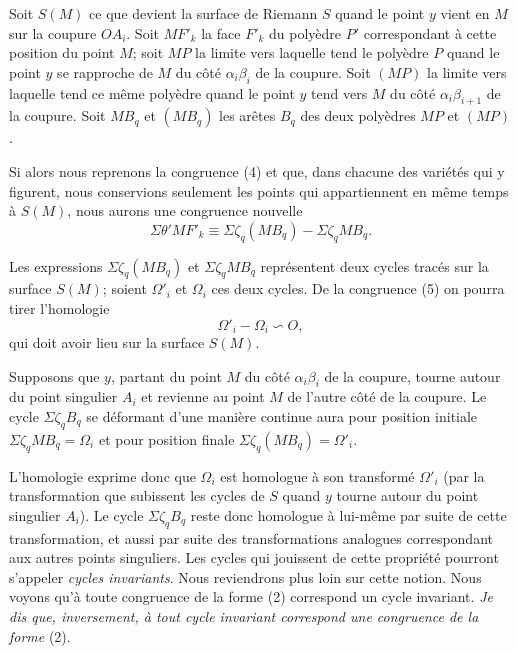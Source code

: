 \documentclass{article}
\begin{document}
Soit $S(M)$ ce que devient la surface de Riemann $S$ quand le point $y$ vient en $M$ sur la coupure $OA_{i}$. Soit $MF'_{k}$ la face $F'_{k}$ du polyèdre $P'$ correspondant à cette position du point $M$; soit $MP$ la limite vers laquelle tend le polyèdre $P$ quand le point $y$ se rapproche de $M$ du côté $\alpha_{i}\beta_{i}$ de la coupure. Soit $(MP)$ la limite vers laquelle tend ce même polyèdre quand le point $y$ tend vers $M$ du côté $\alpha_{i}\beta_{i+1}$ de la coupure. Soit $MB_{q}$ et $(MB_{q})$ les arêtes $B_{q}$ des deux polyèdres $MP$ et $(MP)$.

Si alors nous reprenons la congruence (4) et que, dans chacune des variétés qui y figurent, nous conservions seulement les points qui appartiennent en même temps à $S(M)$, nous aurons une congruence nouvelle
\[ \Sigma \theta' MF'_{k} \equiv \Sigma \zeta_{q} (MB_{q}) - \Sigma \zeta_{q} MB_{q}. \tag{5} \]

Les expressions $\Sigma \zeta_{q} (MB_{q})$ et $\Sigma \zeta_{q} MB_{q}$ représentent deux cycles tracés sur la surface $S(M)$; soient $\Omega'_{i}$ et $\Omega_{i}$ ces deux cycles. De la congruence (5) on pourra tirer l'homologie
\[ \Omega'_{i} - \Omega_{i} \backsim O, \tag{6} \]
qui doit avoir lieu sur la surface $S(M)$.


Supposons que $y$, partant du point $M$ du côté $\alpha_{i}\beta_{i}$ de la coupure, tourne autour du point singulier $A_{i}$ et revienne au point $M$ de l'autre côté de la coupure. Le cycle $\Sigma \zeta_{q} B_{q}$ se déformant d'une manière continue aura pour position initiale $\Sigma \zeta_{q} MB_{q} = \Omega_{i}$ et pour position finale $\Sigma \zeta_{q} (MB_{q}) = \Omega'_{i}$.

L'homologie exprime donc que $\Omega_{i}$ est homologue à son transformé $\Omega'_{i}$ (par la transformation que subissent les cycles de $S$ quand $y$ tourne autour du point singulier $A_{i}$). Le cycle $\Sigma \zeta_{q} B_{q}$ reste donc homologue à lui-même par suite de cette transformation, et aussi par suite des transformations analogues correspondant aux autres points singuliers. Les cycles qui jouissent de cette propriété pourront s'appeler \emph{cycles invariants}. Nous reviendrons plus loin sur cette notion. Nous voyons qu'à toute congruence de la forme (2) correspond un cycle invariant. \emph{Je dis que, inversement, à tout cycle invariant correspond une congruence de la forme} (2).
\end{document}
